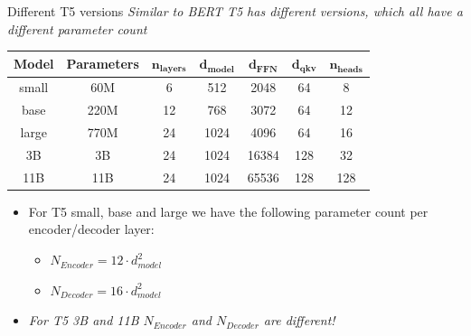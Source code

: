 \documentclass[11pt,compress,t,notes=noshow, xcolor=table]{beamer}
\begin{document}
\begin{frame}{Different T5 versions}
\textit{Similar to BERT T5 has different versions, which all have a different parameter count} 

\begin{table}[h!]
\centering
\small %
\begin{tabular}{|c|c|c|c|c|c|c|}
\hline
\textbf{Model} & \textbf{Parameters} & $\bm{n_{layers}}$ & $\bm{d_{model}}$ & $\bm{d_{FFN}}$ & $\bm{d_{qkv}}$ & $\bm{n_{heads}}$ \\ \hline
small  & 60M  & 6  & 512  & 2048 & 64 & 8 \\ \hline
base   & 220M & 12 & 768  & 3072 & 64 & 12 \\ \hline
large  & 770M & 24 & 1024 & 4096 & 64 & 16 \\ \hline
3B     & 3B   & 24 & 1024 & 16384 & 128 & 32 \\ \hline
11B    & 11B  & 24 & 1024 & 65536 & 128 & 128 \\ \hline
\end{tabular}
\end{table}

\begin{itemize}
    \item For T5 small, base and large we have the following parameter count per encoder/decoder layer:
    \begin{itemize}
        \item $N_{Encoder} = 12\cdot d_{model}^2$
        \item $N_{Decoder} = 16\cdot d_{model}^2$
    \end{itemize}
		\item \textit{For T5 3B and 11B $N_{Encoder}$ and $N_{Decoder}$ are different!}
\end{itemize}
    
\end{frame}



\end{document}
